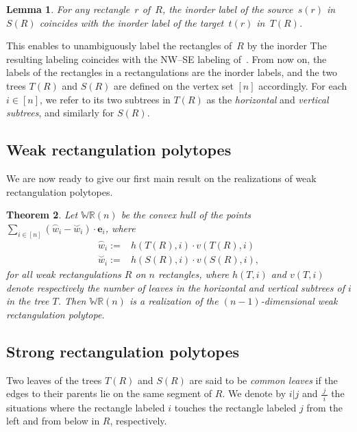\documentclass{amsart}
\newtheorem{theorem}{Theorem}%
\newtheorem{lemma}[theorem]{Lemma}
\theoremstyle{definition}
\newcommand{\darkblue}{\color{darkblue}} %
\newcommand{\defn}[1]{\textsl{\darkblue #1}} %
\newcommand{\polytope}[1]{\mathds{#1}} %
\newcommand{\WRP}{\polytope{WR}} %
\newcommand{\loday}[1]{\overset{\frown}{#1}}
\newcommand{\antiloday}[1]{\overset{\smile}{#1}}
\begin{document}
\begin{lemma}
For any rectangle~$r$ of~$R$, the inorder label of the source~$s(r)$ in~$S(R)$ coincides with the inorder label of the target~$t(r)$ in~$T(R)$.
\end{lemma}

This enables to unambiguously label the rectangles of~$R$ by the inorder 
The resulting labeling coincides with the NW--SE labeling of~\cite{AsinowskiCardinalFelsnerFusy}.
From now on, the labels of the rectangles in a rectangulations are the inorder labels, and the two trees $T(R)$ and $S(R)$ are defined on the vertex set $[n]$ accordingly.
For each $i\in [n]$, we refer to its two subtrees in $T(R)$ as the \defn{horizontal} and \defn{vertical subtrees}, and similarly for $S(R)$. 

\subsection{Weak rectangulation polytopes}

We are now ready to give our first main result on the realizations of weak rectangulation polytopes.

\begin{theorem}
  Let $\WRP (n)$ be the convex hull of the points
  $\sum_{i\in [n]} (\loday{w}_i - \antiloday{w}_i)\cdot \mathbf{e}_i$,
  where
  \[
  \begin{split}
    \loday{w}_i := & h(T(R), i)\cdot v(T(R),i) \\
    \antiloday{w}_i := & h(S(R), i)\cdot v(S(R),i),
  \end{split}
  \]
  for all weak rectangulations $R$ on $n$ rectangles, where $h(T,i)$ and $v(T,i)$ denote respectively the number of leaves in the horizontal and vertical subtrees of $i$ in the tree $T$.
  Then $\WRP (n)$ is a realization of the $(n-1)$-dimensional weak rectangulation polytope.
\end{theorem}

\subsection{Strong rectangulation polytopes}

Two leaves of the trees $T(R)$ and $S(R)$ are said to be \defn{common leaves} if the edges to their parents lie on the same segment of $R$. We denote by $i|j$ and $\frac{\ j\ }i$ the situations where the rectangle labeled $i$ touches the rectangle labeled $j$ from the left and from below in $R$, respectively.
\end{document}
